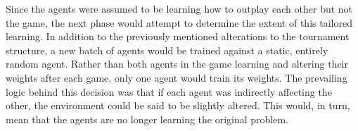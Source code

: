 
Since the agents were assumed to be learning how to outplay each other
but not the game,
the next phase would attempt to determine the extent of this tailored learning.
%
In addition to the previously mentioned alterations to the tournament structure,
a new batch of agents would be trained against a static, entirely random agent.
%
Rather than both agents in the game learning and altering their weights after
each game,
only one agent would train its weights.
%
The prevailing logic behind this decision was that if each agent was indirectly
affecting the other,
the environment could be said to be slightly altered.
%
This would, in turn, mean that the agents are no longer learning the original
problem.

